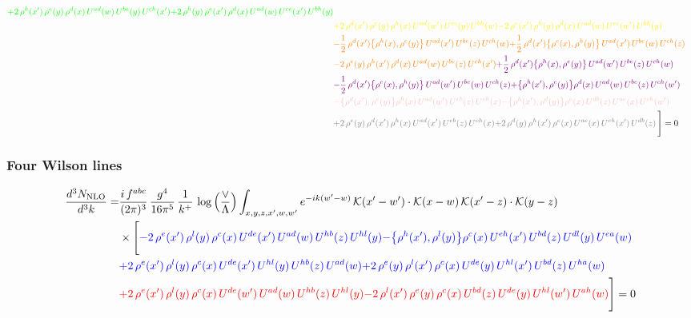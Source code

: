 \documentclass[9pt]{article}
\numberwithin{equation}{section}
\begin{document}
\begin{align}
{\color{green}+2\,\rho^{h}(x')\,\rho^{e}(y)\,\rho^{d}(x)\,U^{ad}(w)\,U^{be}(y)\,U^{ch}(x')}{\color{green}+2\,\rho^{h}(y)\,\rho^{e}(x')\,\rho^{d}(x)\,U^{ad}(w)\,U^{ce}(x')\,U^{bh}(y)}\notag \\ & {\color{yellow}+2\,\rho^{d}(x')\,\rho^{e}(y)\,\rho^{h}(x)\,U^{ad}(w')\,U^{ce}(y)\,U^{bh}(w)}{\color{yellow}-2\,\rho^{e}(x')\,\rho^{h}(y)\,\rho^{d}(x)\,U^{ad}(w)\,U^{ce}(w')\,U^{bh}(y)}\notag \\ & {\color{orange}-\frac{1}{2}\,\rho^{d}(x')\big\{\rho^{h}(x),\rho^{e}(y)\big\}\,U^{ad}(x')\,U^{be}(z)\,U^{ch}(w)}{\color{orange}+\frac{1}{2}\,\rho^{d}(x')\big\{\rho^{e}(x),\rho^{h}(y)\big\}\,U^{ad}(x')\,U^{be}(w)\,U^{ch}(z)}\notag \\
&{\color{orange}-2\,\rho^{e}(y)\,\rho^{h}(x')\,\rho^{d}(x)\,U^{ad}(w)\,U^{be}(z)\,U^{ch}(x')}{\color{violet}+\frac{1}{2}\,\rho^{d}(x')\big\{\rho^{h}(x),\rho^{e}(y)\big\}\,U^{ad}(w')\,U^{be}(z)\,U^{ch}(w)}\notag \\ & {\color{violet}-\frac{1}{2}\,\rho^{d}(x')\big\{\rho^{e}(x),\rho^{h}(y)\big\}\,U^{ad}(w')\,U^{be}(w)\,U^{ch}(z)}{\color{violet}+\big\{\rho^{h}(x'),\rho^{e}(y)\big\}\rho^{d}(x)\,U^{ad}(w)\,U^{be}(z)\,U^{ch}(w')}\notag \\ &{\color{pink}-\big\{\rho^{d}(x'),\rho^{e}(y)\big\}\rho^{h}(x)\,U^{ad}(w')\,U^{eb}(z)\,U^{ch}(x)}{\color{pink}-\big\{\rho^{h}(x'),\rho^{d}(y)\big\}\rho^{e}(x)\,U^{db}(z)\,U^{ae}(x)\,U^{ch}(w')}\notag \\ &{\color{gray}+2\,\rho^{e}(y)\,\rho^{d}(x')\, \rho^{h}(x)\, U^{ad}(x')\,U^{eb}(z)\,U^{ch}(x)}{\color{gray}+2\,\rho^{d}(y)\,\rho^{h}(x')\,\rho^{e}(x)\,U^{ae}(x)\,U^{ch}(x')\,U^{db}(z)}\,\Bigg] = 0
\end{align}    
\subsubsection{Four Wilson lines}
\begin{align}
    \frac{d^{3}N_{\rm NLO}}{d^{3}k}= & \frac{i\,f^{abc}}{(2\pi)^{3}}\,\frac{g^{4}}{16\pi^{5}}\,\frac{1}{k^{+}}\,\log\Big(\frac{\vee}{\Lambda}\Big)\int_{x,y,z,x',w,w'}e^{-ik(w'-w)}\,\mathcal{K}(x'-w')\cdot\mathcal{K}(x-w)\,\mathcal{K}(x'-z)\cdot\mathcal{K}(y-z)\notag \\ & \times\Bigg[{\color{blue}-2\,\rho^{e}(x')\,\rho^{l}(y)\,\rho^{c}(x)\, U^{de}(x')\,U^{ad}(w)\,U^{hb}(z)\,U^{hl}(y)}{\color{blue}-\big\{\rho^{h}(x'),\rho^{l}(y)\big\}\rho^{c}(x)\,U^{eh}(x')\,U^{bd}(z)\,U^{dl}(y)\,U^{ea}(w)}\notag \\ & {\color{blue}+2\,\rho^{e}(x')\,\rho^{l}(y)\, \rho^{c}(x)\, U^{de}(x')\,U^{hl}(y)\,U^{hb}(z)\,U^{ad}(w)} {\color{blue}+2\,\rho^{e}(y)\,\rho^{l}(x')\, \rho^{c}(x)\, U^{de}(y)\,U^{hl}(x')\,U^{bd}(z)\,U^{ha}(w)}\notag \\ & {\color{red}+2\,\rho^{e}(x')\,\rho^{l}(y)\,\rho^{c}(x)\, U^{de}(w')\,U^{ad}(w)\,U^{hb}(z)\,U^{hl}(y)}{\color{red}-2\,\rho^{l}(x')\,\rho^{e}(y)\, \rho^{c}(x)\, U^{bd}(z)\,U^{de}(y)\,U^{hl}(w')\,U^{ah}(w)}\Bigg] = 0
\end{align}    
\end{document}

